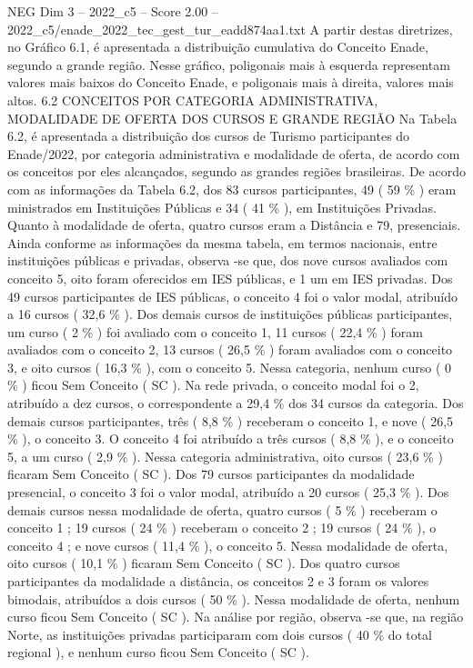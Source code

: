 \begin{textsample}{NEG Dim 3 – 2022\_c5 – Score 2.00 – 2022\_c5/enade\_2022\_tec\_gest\_tur\_eadd874aa1.txt}
A partir destas diretrizes, no Gráfico 6.1, é apresentada a distribuição cumulativa do Conceito Enade, segundo a grande região.
Nesse gráfico, poligonais mais à esquerda representam valores mais baixos do Conceito Enade, e poligonais mais à direita, valores mais altos. 6.2 CONCEITOS POR CATEGORIA ADMINISTRATIVA, MODALIDADE DE OFERTA DOS CURSOS E GRANDE REGIÃO Na Tabela 6.2, é apresentada a distribuição dos cursos de Turismo participantes do Enade/2022, por categoria administrativa e modalidade de oferta, de acordo com os conceitos por eles alcançados, segundo as grandes regiões brasileiras.
De acordo com as informações da Tabela 6.2, dos 83 cursos participantes, 49 ( 59 \% ) eram ministrados em Instituições Públicas e 34 ( 41 \% ), em Instituições Privadas.
Quanto à modalidade de oferta, quatro cursos eram a Distância e 79, presenciais.
Ainda conforme as informações da mesma tabela, em termos nacionais, entre instituições públicas e privadas, observa -se que, dos nove cursos avaliados com conceito 5, oito foram oferecidos em IES públicas, e 1 um em IES privadas.
Dos 49 cursos participantes de IES públicas, o conceito 4 foi o valor modal, atribuído a 16 cursos ( 32,6 \% ).
Dos demais cursos de instituições públicas participantes, um curso ( 2 \% ) foi avaliado com o conceito 1, 11 cursos ( 22,4 \% ) foram avaliados com o conceito 2, 13 cursos ( 26,5 \% ) foram avaliados com o conceito 3, e oito cursos ( 16,3 \% ), com o conceito 5.
Nessa categoria, nenhum curso ( 0 \% ) ficou Sem Conceito ( SC ).
Na rede privada, o conceito modal foi o 2, atribuído a dez cursos, o correspondente a 29,4 \% dos 34 cursos da categoria.
Dos demais cursos participantes, três ( 8,8 \% ) receberam o conceito 1, e nove ( 26,5 \% ), o conceito 3.
O conceito 4 foi atribuído a três cursos ( 8,8 \% ), e o conceito 5, a um curso ( 2,9 \% ).
Nessa categoria administrativa, oito cursos ( 23,6 \% ) ficaram Sem Conceito ( SC ).
Dos 79 cursos participantes da modalidade presencial, o conceito 3 foi o valor modal, atribuído a 20 cursos ( 25,3 \% ).
Dos demais cursos nessa modalidade de oferta, quatro cursos ( 5 \% ) receberam o conceito 1 ; 19 cursos ( 24 \% ) receberam o conceito 2 ; 19 cursos ( 24 \% ), o conceito 4 ; e nove cursos ( 11,4 \% ), o conceito 5.
Nessa modalidade de oferta, oito cursos ( 10,1 \% ) ficaram Sem Conceito ( SC ).
Dos quatro cursos participantes da modalidade a distância, os conceitos 2 e 3 foram os valores bimodais, atribuídos a dois cursos ( 50 \% ).
Nessa modalidade de oferta, nenhum curso ficou Sem Conceito ( SC ).
Na análise por região, observa -se que, na região Norte, as instituições privadas participaram com dois cursos ( 40 \% do total regional ), e nenhum curso ficou Sem Conceito ( SC ).

\end{textsample}
